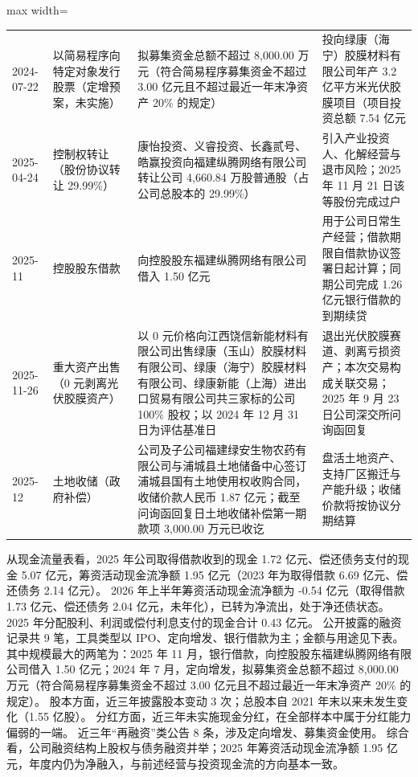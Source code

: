 \begin{center}
\begin{adjustbox}{max width=\textwidth}
\begin{tabular}{@{}p{1.45cm}p{2.55cm}p{4.05cm}p{4.95cm}@{}}
2024-07-22 & 以简易程序向特定对象发行股票（定增预案，未实施） & 拟募集资金总额不超过 8,\allowbreak{}000.00 万元（符合简易程序募集资金不超过 3.00 亿元且不超过最近一年末净资产 20\% 的规定） & 投向绿康（海宁）胶膜材料有限公司年产 3.2 亿平方米光伏胶膜项目（项目投资总额 7.54 亿元 \\
2025-04-24 & 控制权转让（股份协议转让 29.99\%） & 康怡投资、\allowbreak{}义睿投资、\allowbreak{}长鑫贰号、\allowbreak{}皓赢投资向福建纵腾网络有限公司转让公司 4,\allowbreak{}660.84 万股普通股（占公司总股本的 29.99\%） & 引入产业投资人、\allowbreak{}化解经营与退市风险；2025 年 11 月 21 日该等股份完成过户 \\
2025-11 & 控股股东借款 & 向控股股东福建纵腾网络有限公司借入 1.50 亿元 & 用于公司日常生产经营；借款期限自借款协议签署日起计算；同期公司完成 1.26 亿元银行借款的到期续贷 \\
2025-11-26 & 重大资产出售（0 元剥离光伏胶膜资产） & 以 0 元价格向江西饶信新能材料有限公司出售绿康（玉山）胶膜材料有限公司、\allowbreak{}绿康（海宁）胶膜材料有限公司、\allowbreak{}绿康新能（上海）进出口贸易有限公司共三家标的公司 100\% 股权；以 2024 年 12 月 31 日为评估基准日 & 退出光伏胶膜赛道、\allowbreak{}剥离亏损资产；本次交易构成关联交易；2025 年 9 月 23 日公司深交所问询函回复 \\
2025-12 & 土地收储（政府补偿） & 公司及子公司福建绿安生物农药有限公司与浦城县土地储备中心签订浦城县国有土地使用权收购合同，\allowbreak{}收储价款人民币 1.87 亿元；截至问询函回复日土地收储补偿第一期款项 3,\allowbreak{}000.00 万元已收讫 & 盘活土地资产、\allowbreak{}支持厂区搬迁与产能升级；收储价款将按协议分期结算 \\
\bottomrule
\end{tabular}
\end{adjustbox}
\end{center}

 从现金流量表看，2025 年公司取得借款收到的现金 1.72 亿元、偿还债务支付的现金 5.07 亿元，筹资活动现金流净额 1.95 亿元（2023 年为取得借款 6.69 亿元、偿还债务 2.14 亿元）。 2026 年上半年筹资活动现金流净额为 -0.54 亿元（取得借款 1.73 亿元、偿还债务 2.04 亿元，未年化），已转为净流出，处于净还债状态。 2025 年分配股利、利润或偿付利息支付的现金合计 0.43 亿元。 公开披露的融资记录共 9 笔，工具类型以 IPO、定向增发、银行借款为主；金额与用途见下表。 其中规模最大的两笔为：2025 年 11 月，银行借款，向控股股东福建纵腾网络有限公司借入 1.50 亿元；2024 年 7 月，定向增发，拟募集资金总额不超过 8,000.00 万元（符合简易程序募集资金不超过 3.00 亿元且不超过最近一年末净资产 20\% 的规定）。 股本方面，近三年披露股本变动 3 次；总股本自 2021 年末以来未发生变化（1.55 亿股）。 分红方面，近三年未实施现金分红，在全部样本中属于分红能力偏弱的一端。 近三年“再融资”类公告 8 条，涉及定向增发、募集资金使用。 综合看，公司融资结构上股权与债务融资并举；2025 年筹资活动现金流净额 1.95 亿元，年度内仍为净融入，与前述经营与投资现金流的方向基本一致。

